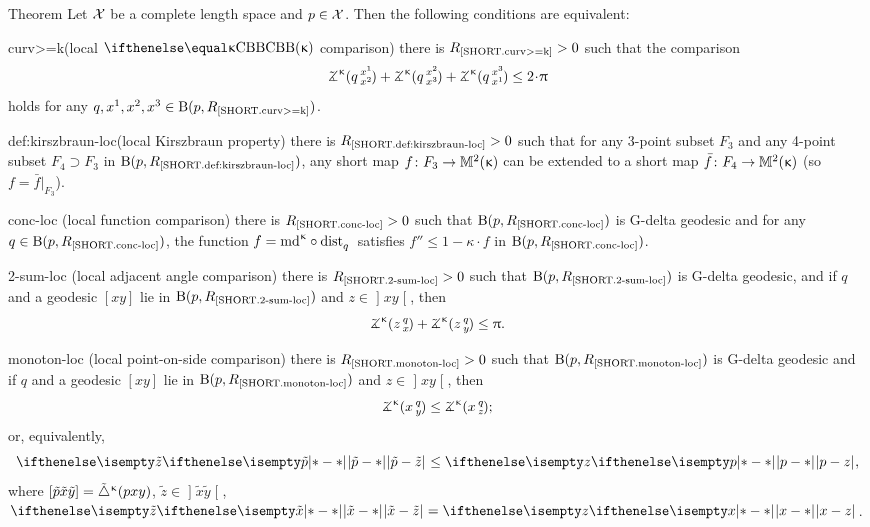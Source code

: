 \begin{thm}{Theorem}\label{thm:=def-loc}
Let $\mathcal{X}$ be a complete length space and $p\in \spc{X}$.
Then the following conditions are equivalent:
\begin{subthmN}
{curv>=k}(local $\Alex\kappa$ comparison) there is $R_{\hbox{\rm\scriptsize\ref{SHORT.curv>=k}}}>0$ such that the comparison 
\[\angk\kappa q{x^1}{x^2}
+\angk\kappa q{x^2}{x^3}
+\angk\kappa q{x^3}{x^1}
\le 2\cdot\pi\]
holds for any $q,x^1,x^2,x^3\in \oBall(p,R_{\hbox{\rm\scriptsize\ref{SHORT.curv>=k}}})$.
\end{subthmN}

\begin{subthmN}{def:kirszbraun-loc}(local Kirszbraun property) 
there is $R_{\hbox{\rm\scriptsize\ref{SHORT.def:kirszbraun-loc}}}>0$ 
such that for any 3-point subset $F_3$ and any 4-point subset $F_4\supset F_3$ in $\mathrm{B}{}(p,R_{\hbox{\rm\scriptsize\ref{SHORT.def:kirszbraun-loc}}})$, any short map $f\:F_3\to\Lob2\kappa$ can be extended to a short map $\bar f\:F_4\to\Lob2\kappa$ (so $f=\bar f|_{F_3}$).
\end{subthmN}

\begin{subthmN}{conc-loc} (local function comparison) there is 
$R_{\hbox{\rm\scriptsize\ref{SHORT.conc-loc}}}>0$ such that 
$\mathrm{B}{}(p,R_{\hbox{\rm\scriptsize\ref{SHORT.conc-loc}}})$ 
is G-delta geodesic and for any 
$q\in \oBall(p,R_{\hbox{\rm\scriptsize\ref{SHORT.conc-loc}}})$, 
the function $f=\md\kappa\circ\distfun{q}{}{}$ satisfies 
$f''\le 1-\kappa\cdot  f$ in
$\mathrm{B}{}(p,R_{\hbox{\rm\scriptsize\ref{SHORT.conc-loc}}})$.
\end{subthmN}

\begin{subthmN}{2-sum-loc} (local adjacent angle comparison) there is
$R_{\hbox{\rm\scriptsize\ref{SHORT.2-sum-loc}}}>0$ 
such that $\mathrm{B}{}(p,R_{\hbox{\rm\scriptsize\ref{SHORT.2-sum-loc}}})$ 
is G-delta geodesic, and if $q$ and a geodesic $[x y]$ lie in
$\mathrm{B}{}(p,R_{\hbox{\rm\scriptsize\ref{SHORT.2-sum-loc}}})$ 
and $z\in \mathopen{]}x y\mathclose{[}$, then
\[\angk\kappa z q x
+\angk\kappa z q y
\le \pi.\]
\end{subthmN}

\begin{subthmN}{monoton-loc} (local point-on-side comparison) 
there is $R_{\hbox{\rm\scriptsize\ref{SHORT.monoton-loc}}}>0$ 
such that $\mathrm{B}{}(p,R_{\hbox{\rm\scriptsize\ref{SHORT.monoton-loc}}})$ is G-delta geodesic and if $q$ and a geodesic $[x y]$ lie in $\mathrm{B}{}(p,R_{\hbox{\rm\scriptsize\ref{SHORT.monoton-loc}}})$ 
and $z\in \mathopen{]}x y\mathclose{[}$, then
\[\angk\kappa x q y
\le\angk\kappa x q z;\]
or, equivalently, 
\[\dist{\tilde p}{\tilde z}{}\le \dist{p}{z}{},\]
where $[{\tilde p}{\tilde x}{\tilde y}]={\tilde\triangle}^{\upkappa}(p x y)$, $\tilde z\in\mathopen{]} \tilde x\tilde y\mathclose{[}$, $\dist{\tilde x}{\tilde z}{}=\dist{x}{z}{}$.
\end{subthmN}


\end{thm}
